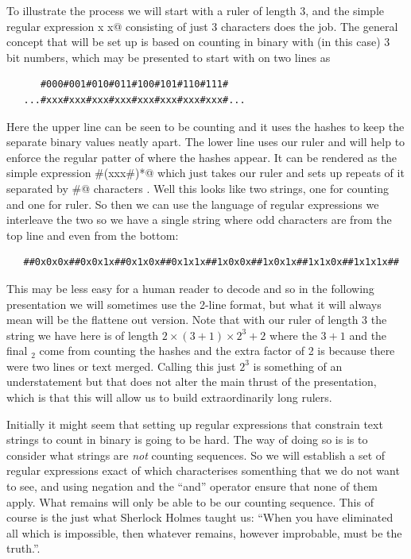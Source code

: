 To illustrate the process we will start with a ruler of length 3, and
the simple regular expression \verb@x x x@ consisting of just 3 characters
does the job. The general concept that will be set up is based on
counting in binary with (in this case) 3 bit numbers, which may be
presented to start with on two lines as
\begin{verbatim}
      #000#001#010#011#100#101#110#111#
   ...#xxx#xxx#xxx#xxx#xxx#xxx#xxx#xxx#...
\end{verbatim}
Here the upper line can be seen to be counting and it uses the hashes to
keep the separate binary values neatly apart. The lower line uses our
ruler and will help to enforce the regular patter of where the hashes
appear. It can be rendered as the simple expression
\verb@#(xxx#)*@ which just takes our ruler and sets up repeats of
it separated by \verb@#@ characters . Well this looks like two strings,
one for counting and one for ruler. So then we can use the language of
regular expressions we interleave the two so we have a single string where
odd characters are from the top line and even from the bottom:
{\footnotesize
\begin{verbatim}
   ##0x0x0x##0x0x1x##0x1x0x##0x1x1x##1x0x0x##1x0x1x##1x1x0x##1x1x1x##  
\end{verbatim}}
This may be less easy for a human reader to decode and so in the
following presentation we will sometimes use the 2-line format, but
what it will always mean will be the flattene out version. Note
that with our ruler of length 3 the string we have here is
of length $2 \times (3+1)\times 2^{3} + 2$ where the $3+1$ and the final
$_2$ come from counting the hashes and the extra factor of 2 is because
there were two lines or text merged. Calling this just $2^3$ is something
of an understatement but that does not alter the main thrust of the
presentation, which is that this will allow us to build extraordinarily
long rulers.

Initially it might seem that setting up regular expressions that constrain
text strings to count in binary is going to be hard. The way of doing so is
is to consider what strings are {\em not} counting sequences. So we will
establish a set of regular expressions exact of which characterises somenthing
that we do not want to see, and using negation and the ``and'' operator
ensure that none of them apply. What remains will only be able to be
our counting sequence. This of course is the just what Sherlock Holmes
taught us: ``When you have eliminated all which is impossible, then whatever
remains, however improbable, must be the truth.''.

